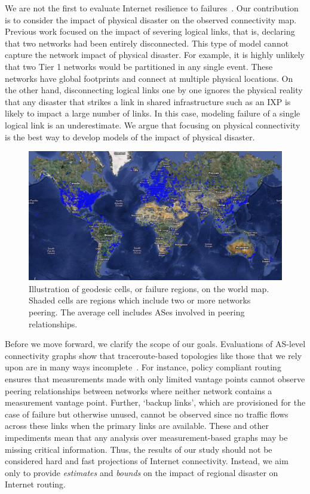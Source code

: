 We are not the first to evaluate Internet resilience to
failures~\cite{michigan, measuringresilience, resilience-under-BGP,
resilience-complex-networks}.  Our contribution is to consider the impact of
physical disaster on the observed connectivity map.  Previous work focused on
the impact of severing logical links, that is, declaring that two networks had
been entirely disconnected.  This type of model cannot capture the network
impact of physical disaster.  For example, it is highly unlikely that two Tier
1 networks would be partitioned in any single event.  These networks have
global footprints and connect at multiple physical locations.
  On the other hand, disconnecting logical links
one by one ignores the physical reality that any disaster that strikes a link
in shared infrastructure such as an IXP is likely to impact a large number of
links.  In this case, modeling failure of a single logical link is an
underestimate.  We argue that focusing on physical connectivity is the best way to
develop models of the impact of physical disaster. 
 
\begin{figure}[htb]
\centering
\includegraphics[width=6in]{world_map.jpg}
\caption[]{\label{fig:worldmap}  Illustration of geodesic cells, or failure regions, on the world map. Shaded cells are regions which include two or more networks peering. The average cell includes  ASes involved in  peering relationships.} 
\end{figure}

Before we move forward, we clarify the scope of our goals.  Evaluations of
AS-level connectivity graphs show that traceroute-based topologies like those
that we rely upon are in many ways incomplete~\cite{walter}.  For instance,
policy compliant routing ensures that measurements made with only limited
vantage points cannot observe peering relationships between networks where
neither network contains a measurement vantage point.  Further, `backup links',
which are provisioned for the case of failure but otherwise unused, cannot be
observed since no traffic flows across these links when the primary links are
available.  These and other impediments mean that any analysis over
measurement-based graphs may be missing critical information.  Thus, the
results of our study should not be considered hard and fast projections of
Internet connectivity.  Instead, we aim only to provide {\it estimates} and
{\it bounds} on the impact of regional disaster on Internet routing.

